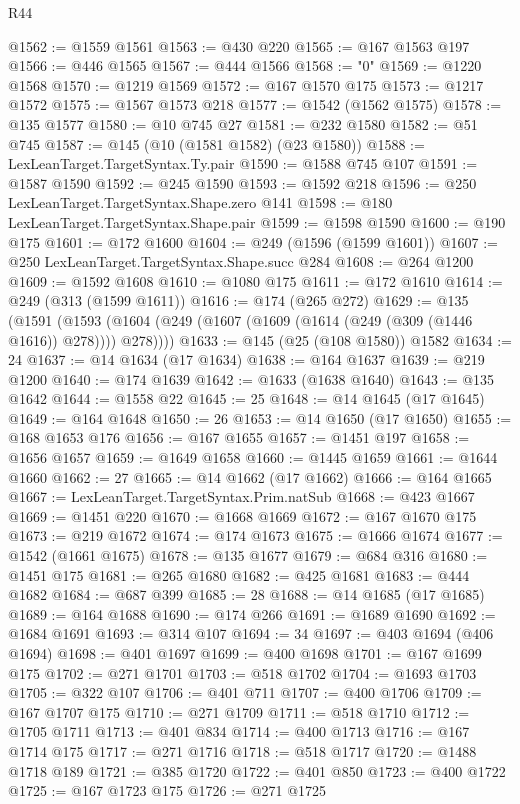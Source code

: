 \begin{lexlean}{R44}
\begin{coremodule}
@1562 := @1559 @1561
@1563 := @430 @220
@1565 := @167 @1563 @197
@1566 := @446 @1565
@1567 := @444 @1566
@1568 := "0"
@1569 := @1220 @1568
@1570 := @1219 @1569
@1572 := @167 @1570 @175
@1573 := @1217 @1572
@1575 := @1567 @1573 @218
@1577 := @1542 (@1562 @1575)
@1578 := @135 @1577
@1580 := @10 @745 @27
@1581 := @232 @1580
@1582 := @51 @745
@1587 := @145 (@10 (@1581 @1582) (@23 @1580))
@1588 := LexLeanTarget.TargetSyntax.Ty.pair
@1590 := @1588 @745 @107
@1591 := @1587 @1590
@1592 := @245 @1590
@1593 := @1592 @218
@1596 := @250 LexLeanTarget.TargetSyntax.Shape.zero @141
@1598 := @180 LexLeanTarget.TargetSyntax.Shape.pair
@1599 := @1598 @1590
@1600 := @190 @175
@1601 := @172 @1600
@1604 := @249 (@1596 (@1599 @1601))
@1607 := @250 LexLeanTarget.TargetSyntax.Shape.succ @284
@1608 := @264 @1200
@1609 := @1592 @1608
@1610 := @1080 @175
@1611 := @172 @1610
@1614 := @249 (@313 (@1599 @1611))
@1616 := @174 (@265 @272)
@1629 := @135
    (@1591 (@1593 (@1604 (@249 (@1607 (@1609 (@1614 (@249 (@309 (@1446 @1616)) @278)))) @278))))
@1633 := @145 (@25 (@108 @1580)) @1582
@1634 := 24
@1637 := @14 @1634 (@17 @1634)
@1638 := @164 @1637
@1639 := @219 @1200
@1640 := @174 @1639
@1642 := @1633 (@1638 @1640)
@1643 := @135 @1642
@1644 := @1558 @22
@1645 := 25
@1648 := @14 @1645 (@17 @1645)
@1649 := @164 @1648
@1650 := 26
@1653 := @14 @1650 (@17 @1650)
@1655 := @168 @1653 @176
@1656 := @167 @1655
@1657 := @1451 @197
@1658 := @1656 @1657
@1659 := @1649 @1658
@1660 := @1445 @1659
@1661 := @1644 @1660
@1662 := 27
@1665 := @14 @1662 (@17 @1662)
@1666 := @164 @1665
@1667 := LexLeanTarget.TargetSyntax.Prim.natSub
@1668 := @423 @1667
@1669 := @1451 @220
@1670 := @1668 @1669
@1672 := @167 @1670 @175
@1673 := @219 @1672
@1674 := @174 @1673
@1675 := @1666 @1674
@1677 := @1542 (@1661 @1675)
@1678 := @135 @1677
@1679 := @684 @316
@1680 := @1451 @175
@1681 := @265 @1680
@1682 := @425 @1681
@1683 := @444 @1682
@1684 := @687 @399
@1685 := 28
@1688 := @14 @1685 (@17 @1685)
@1689 := @164 @1688
@1690 := @174 @266
@1691 := @1689 @1690
@1692 := @1684 @1691
@1693 := @314 @107
@1694 := 34
@1697 := @403 @1694 (@406 @1694)
@1698 := @401 @1697
@1699 := @400 @1698
@1701 := @167 @1699 @175
@1702 := @271 @1701
@1703 := @518 @1702
@1704 := @1693 @1703
@1705 := @322 @107
@1706 := @401 @711
@1707 := @400 @1706
@1709 := @167 @1707 @175
@1710 := @271 @1709
@1711 := @518 @1710
@1712 := @1705 @1711
@1713 := @401 @834
@1714 := @400 @1713
@1716 := @167 @1714 @175
@1717 := @271 @1716
@1718 := @518 @1717
@1720 := @1488 @1718 @189
@1721 := @385 @1720
@1722 := @401 @850
@1723 := @400 @1722
@1725 := @167 @1723 @175
@1726 := @271 @1725

\end{coremodule}
\end{lexlean}
